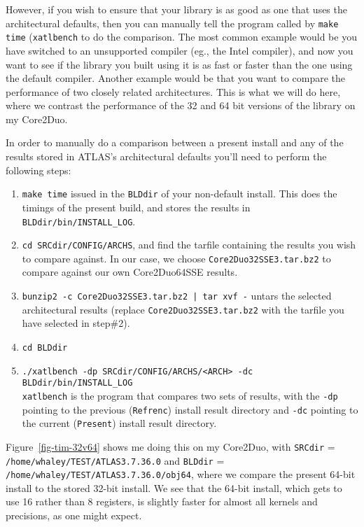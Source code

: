 \documentclass[11pt]{article}
\begin{document}
However, if you wish to ensure that your library is as good as one that
uses the architectural defaults, then you can manually tell the program
called by {\tt make time} ({\tt xatlbench} to do the comparison.  The most
common example would
be you have switched to an unsupported compiler (eg., the Intel compiler),
and now you want to see if the library you built using it is as fast or faster
than the one using the default compiler.  Another example would
be that you want to compare the performance of two closely related
architectures.  This is what we will do here, where we contrast the performance
of the 32 and 64 bit versions of the library on my Core2Duo.

In order to manually do a comparison between a present install and any of
the results stored in ATLAS's architectural defaults you'll need to
perform the following steps:
\begin{enumerate}
\item  {\tt make time} issued in the {\tt BLDdir} of your non-default install.
       This does the timings of the present build, and stores the results
       in {\tt BLDdir/bin/INSTALL\_LOG}.
\item {\tt cd SRCdir/CONFIG/ARCHS}, and find the tarfile containing the
      results you wish to compare against.  In our case, we choose
      {\tt Core2Duo32SSE3.tar.bz2} to compare against our own Core2Duo64SSE
      results.
\item {\tt bunzip2 -c Core2Duo32SSE3.tar.bz2 | tar xvf -} untars the
      selected architectural results (replace {\tt Core2Duo32SSE3.tar.bz2} 
      with the tarfile you have selected in step\#2).
\item {\tt cd BLDdir}
\item \verb|./xatlbench -dp SRCdir/CONFIG/ARCHS/<ARCH> -dc BLDdir/bin/INSTALL_LOG|  \\
    {\tt xatlbench} is the program that compares two sets of results, with
    the {\tt -dp} pointing to the previous ({\tt Refrenc}) install result
    directory and {\tt -dc} pointing to the current ({\tt Present})
    install result directory.
\end{enumerate}

Figure~\ref{fig-tim-32v64} shows me doing this on my Core2Duo, with 
{\tt SRCdir} = {\tt /home/whaley/TEST/ATLAS3.7.36.0} and
{\tt BLDdir} = {\tt /home/whaley/TEST/ATLAS3.7.36.0/obj64}, where we compare
the present 64-bit install to the stored 32-bit install.
We see that the 64-bit install, which gets to use 16 rather than 8 registers,
is slightly faster for almost all kernels and precisions, as one might expect.
\end{document}
